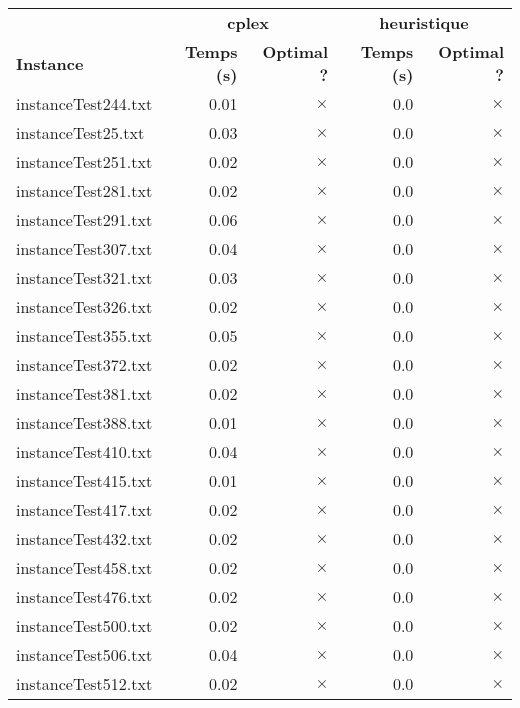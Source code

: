 \documentclass{article}
\begin{document}
\newpage
\begin{center}
\renewcommand{\arraystretch}{1.4} 
 \begin{tabular}{lrrrr}
	\hline
 & \multicolumn{2}{c}{\textbf{cplex}} & \multicolumn{2}{c}{\textbf{heuristique}}\\
\textbf{Instance}  & \textbf{Temps (s)} & \textbf{Optimal ?}  & \textbf{Temps (s)} & \textbf{Optimal ?} \\\hline

instanceTest244.txt & 0.01 & 
$\times$
 & 0.0 & 
$\times$
\\
instanceTest25.txt & 0.03 & 
$\times$
 & 0.0 & 
$\times$
\\
instanceTest251.txt & 0.02 & 
$\times$
 & 0.0 & 
$\times$
\\
instanceTest281.txt & 0.02 & 
$\times$
 & 0.0 & 
$\times$
\\
instanceTest291.txt & 0.06 & 
$\times$
 & 0.0 & 
$\times$
\\
instanceTest307.txt & 0.04 & 
$\times$
 & 0.0 & 
$\times$
\\
instanceTest321.txt & 0.03 & 
$\times$
 & 0.0 & 
$\times$
\\
instanceTest326.txt & 0.02 & 
$\times$
 & 0.0 & 
$\times$
\\
instanceTest355.txt & 0.05 & 
$\times$
 & 0.0 & 
$\times$
\\
instanceTest372.txt & 0.02 & 
$\times$
 & 0.0 & 
$\times$
\\
instanceTest381.txt & 0.02 & 
$\times$
 & 0.0 & 
$\times$
\\
instanceTest388.txt & 0.01 & 
$\times$
 & 0.0 & 
$\times$
\\
instanceTest410.txt & 0.04 & 
$\times$
 & 0.0 & 
$\times$
\\
instanceTest415.txt & 0.01 & 
$\times$
 & 0.0 & 
$\times$
\\
instanceTest417.txt & 0.02 & 
$\times$
 & 0.0 & 
$\times$
\\
instanceTest432.txt & 0.02 & 
$\times$
 & 0.0 & 
$\times$
\\
instanceTest458.txt & 0.02 & 
$\times$
 & 0.0 & 
$\times$
\\
instanceTest476.txt & 0.02 & 
$\times$
 & 0.0 & 
$\times$
\\
instanceTest500.txt & 0.02 & 
$\times$
 & 0.0 & 
$\times$
\\
instanceTest506.txt & 0.04 & 
$\times$
 & 0.0 & 
$\times$
\\
instanceTest512.txt & 0.02 & 
$\times$
 & 0.0 & 
$\times$
\\

\end{tabular}
\end{center}
\end{document}
